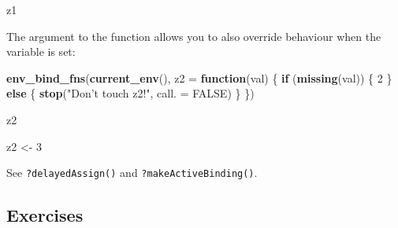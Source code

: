 \documentclass[]{book}
\newenvironment{Shaded}{\begin{snugshade}}{\end{snugshade}}
\newcommand{\ControlFlowTok}[1]{\textcolor[rgb]{0.13,0.29,0.53}{\textbf{#1}}}
\newcommand{\DataTypeTok}[1]{\textcolor[rgb]{0.13,0.29,0.53}{#1}}
\newcommand{\DecValTok}[1]{\textcolor[rgb]{0.00,0.00,0.81}{#1}}
\newcommand{\KeywordTok}[1]{\textcolor[rgb]{0.13,0.29,0.53}{\textbf{#1}}}
\newcommand{\NormalTok}[1]{#1}
\newcommand{\OtherTok}[1]{\textcolor[rgb]{0.56,0.35,0.01}{#1}}
\newcommand{\StringTok}[1]{\textcolor[rgb]{0.31,0.60,0.02}{#1}}
\theoremstyle{definition}
\theoremstyle{definition}
\theoremstyle{definition}
\theoremstyle{remark}
\begin{document}
\begin{itemize}
\begin{Shaded}
\begin{Highlighting}[]
\NormalTok{z1}
\end{Highlighting}
\end{Shaded}

  The argument to the function allows you to also override behaviour
  when the variable is set:

\begin{Shaded}
\begin{Highlighting}[]
\KeywordTok{env_bind_fns}\NormalTok{(}\KeywordTok{current_env}\NormalTok{(), }\DataTypeTok{z2 =} \ControlFlowTok{function}\NormalTok{(val) \{}
  \ControlFlowTok{if}\NormalTok{ (}\KeywordTok{missing}\NormalTok{(val)) \{}
    \DecValTok{2}
\NormalTok{  \} }\ControlFlowTok{else}\NormalTok{ \{}
     \KeywordTok{stop}\NormalTok{(}\StringTok{"Don't touch z2!"}\NormalTok{, }\DataTypeTok{call. =} \OtherTok{FALSE}\NormalTok{)}
\NormalTok{  \}}
\NormalTok{\})}

\NormalTok{z2}
\end{Highlighting}
\end{Shaded}

\begin{Shaded}
\begin{Highlighting}[]
\NormalTok{z2 <-}\StringTok{ }\DecValTok{3}
\end{Highlighting}
\end{Shaded}
\end{itemize}

See \texttt{?delayedAssign()} and \texttt{?makeActiveBinding()}.

\hypertarget{exercises-6}{%
\subsection{Exercises}\label{exercises-6}}
\end{document}
